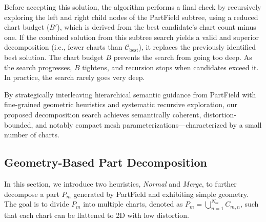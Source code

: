 Before accepting this solution, the algorithm performs a final check by recursively exploring the left and right child nodes of the PartField subtree, using a reduced chart budget ($B'$), which is derived from the best candidate’s chart count minus one. If the combined solution from this subtree search yields a valid and superior decomposition (i.e., fewer charts than $\mathscr{C}_{\text{best}}$), it replaces the previously identified best solution. The chart budget $B$ prevents the search from going too deep. As the search progresses, $B$ tightens, and recursion stops when candidates exceed it. In practice, the search rarely goes very deep.

By strategically interleaving hierarchical semantic guidance from PartField with fine-grained geometric heuristics and systematic recursive exploration, our proposed decomposition search achieves semantically coherent, distortion-bounded, and notably compact mesh parameterizations—characterized by a small number of charts.

\subsection{Geometry-Based Part Decomposition}
\label{sec:heuristic}
In this section, we introduce two heuristics, \emph{Normal} and \emph{Merge}, to further decompose a part $P_m$ generated by PartField and exhibiting simple geometry. The goal is to divide $P_m$ into multiple charts, denoted as $P_m = \bigcup_{n=1}^{N_m} C_{m,n}$, such that each chart can be flattened to 2D with low distortion.

